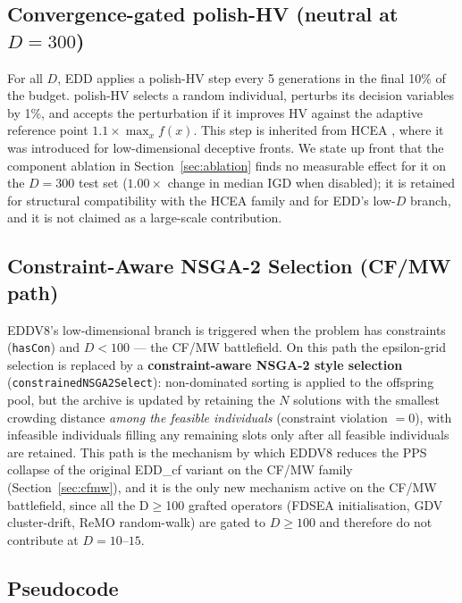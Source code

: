 \documentclass[preprint,12pt]{elsarticle}
\begin{document}
\subsection{Convergence-gated polish-HV (neutral at $D = 300$)}
\label{sec:polish}

For all $D$, EDD applies a polish-HV step every 5 generations in the final
10\% of the budget. polish-HV selects a random individual, perturbs its
decision variables by 1\%, and accepts the perturbation if it improves HV
against the adaptive reference point $1.1 \times \max_x f(x)$. This step is
inherited from HCEA \cite{hcea2026}, where it was introduced for
low-dimensional deceptive fronts. We state up front that the component
ablation in Section~\ref{sec:ablation} finds no measurable effect for it on
the $D = 300$ test set ($1.00\times$ change in median IGD when disabled); it
is retained for structural compatibility with the HCEA family and for EDD's
low-$D$ branch, and it is not claimed as a large-scale contribution.

\subsection{Constraint-Aware NSGA-2 Selection (CF/MW path)}
\label{sec:cns}

EDDV8's low-dimensional branch is triggered when the problem has
constraints (\texttt{hasCon}) and $D < 100$ --- the CF/MW battlefield.
On this path the epsilon-grid selection is replaced by a
\textbf{constraint-aware NSGA-2 style selection}
(\texttt{constrainedNSGA2Select}): non-dominated sorting is applied to
the offspring pool, but the archive is updated by retaining the
$N$ solutions with the smallest crowding distance \emph{among the
feasible individuals} (constraint violation $= 0$), with infeasible
individuals filling any remaining slots only after all feasible
individuals are retained. This path is the mechanism by which EDDV8
reduces the PPS collapse of the original EDD\_cf variant on the CF/MW
family (Section~\ref{sec:cfmw}), and it is the only new mechanism
active on the CF/MW battlefield, since all the D$\ge$100 grafted
operators (FDSEA initialisation, GDV cluster-drift, ReMO random-walk)
are gated to $D \ge 100$ and therefore do not contribute at
$D = 10$--$15$.

\subsection{Pseudocode}
\end{document}
